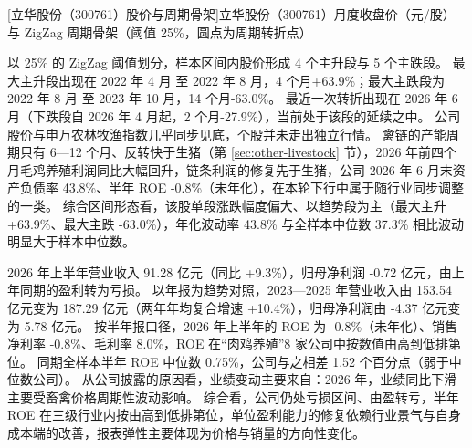 \begin{center}
\begin{minipage}{\textwidth}\centering
{}

[立华股份（300761）股价与周期骨架]{立华股份（300761）月度收盘价（元/股）与 ZigZag 周期骨架（阈值 25\%，圆点为周期转折点）}
\end{minipage}
\end{center}

 以 25\% 的 ZigZag 阈值划分，样本区间内股价形成 4 个主升段与 5 个主跌段。 最大主升段出现在 2022 年 4 月 至 2022 年 8 月，4 个月+63.9\%；最大主跌段为 2022 年 8 月 至 2023 年 10 月，14 个月-63.0\%。 最近一次转折出现在 2026 年 6 月（下跌段自 2026 年 4 月起，2 个月-27.9\%），当前处于该段的延续之中。 公司股价与申万农林牧渔指数几乎同步见底，个股并未走出独立行情。 禽链的产能周期只有 6---12 个月、反转快于生猪（第 \ref{sec:other-livestock} 节），2026 年前四个月毛鸡养殖利润同比大幅回升，链条利润的修复先于生猪，公司 2026 年 6 月末资产负债率 43.8\%、半年 ROE -0.8\%（未年化），在本轮下行中属于随行业同步调整的一类。 综合区间形态看，该股单段涨跌幅度偏大、以趋势段为主（最大主升 +63.9\%、最大主跌 -63.0\%），年化波动率 43.8\% 与全样本中位数 37.3\% 相比波动明显大于样本中位数。

 2026 年上半年营业收入 91.28 亿元（同比 +9.3\%），归母净利润 -0.72 亿元，由上年同期的盈利转为亏损。 以年报为趋势对照，2023---2025 年营业收入由 153.54 亿元变为 187.29 亿元（两年年均复合增速 +10.4\%），归母净利润由 -4.37 亿元变为 5.78 亿元。 按半年报口径，2026 年上半年的 ROE 为 -0.8\%（未年化）、销售净利率 -0.8\%、毛利率 8.0\%，ROE 在“肉鸡养殖”8 家公司中按数值由高到低排第位。 同期全样本半年 ROE 中位数 0.75\%，公司与之相差 1.52 个百分点（弱于中位数公司）。 从公司披露的原因看，业绩变动主要来自：2026 年，业绩同比下滑主要受畜禽价格周期性波动影响。 综合看，公司仍处亏损区间、由盈转亏，半年 ROE 在三级行业内按由高到低排第位，单位盈利能力的修复依赖行业景气与自身成本端的改善，报表弹性主要体现为价格与销量的方向性变化。

